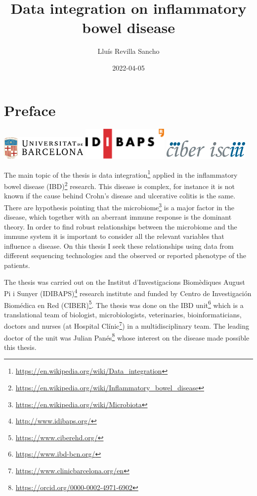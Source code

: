 \documentclass[
  12pt,
  a4paper,
  twoside,
  openright]{book}
\title{Data integration on inflammatory bowel disease}
\author{Lluís Revilla Sancho}
\date{2022-04-05}
\DeclareRobustCommand{\href}[2]{#2\footnote{\url{#1}}}
\begin{document}
\maketitle

{
\hypersetup{linkcolor=}
\setcounter{tocdepth}{2}
\tableofcontents
}
\listoffigures
\listoftables
\hypertarget{preface}{%
\chapter*{Preface}\label{preface}}

\includegraphics[width=1.66667in,height=\textheight]{images/ub_logo.png} \includegraphics[width=1.66667in,height=\textheight]{images/idibaps_logo.png} \includegraphics[width=1.66667in,height=0.39583in]{images/logo_ciber.png}

The main topic of the thesis is \href{https://en.wikipedia.org/wiki/Data_integration}{data integration} applied in the \href{https://en.wikipedia.org/wiki/Inflammatory_bowel_disease}{inflammatory bowel disease (IBD)} research.
This disease is complex, for instance it is not known if the cause behind Crohn's disease and ulcerative colitis is the same.
There are hypothesis pointing that the \href{https://en.wikipedia.org/wiki/Microbiota}{microbiome} is a major factor in the disease, which together with an aberrant immune response is the dominant theory.
In order to find robust relationships between the microbiome and the immune system it is important to consider all the relevant variables that influence a disease.
On this thesis I seek these relationships using data from different sequencing technologies and the observed or reported phenotype of the patients.

The thesis was carried out on the \href{http://www.idibaps.org/}{Institut d'Investigacions Biomèdiques August Pi i Sunyer (IDIBAPS)} research institute and funded by \href{https://www.ciberehd.org/}{Centro de Investigación Biomédica en Red (CIBER)}.
The thesis was done on \href{https://www.ibd-bcn.org/}{the IBD unit} which is a translational team of biologist, microbiologists, veterinaries, bioinformaticians, doctors and nurses (at \href{https://www.clinicbarcelona.org/en}{Hospital Clínic}) in a multidisciplinary team.
The leading doctor of the unit was \href{https://orcid.org/0000-0002-4971-6902}{Julian Panés} whose interest on the disease made possible this thesis.
\end{document}
